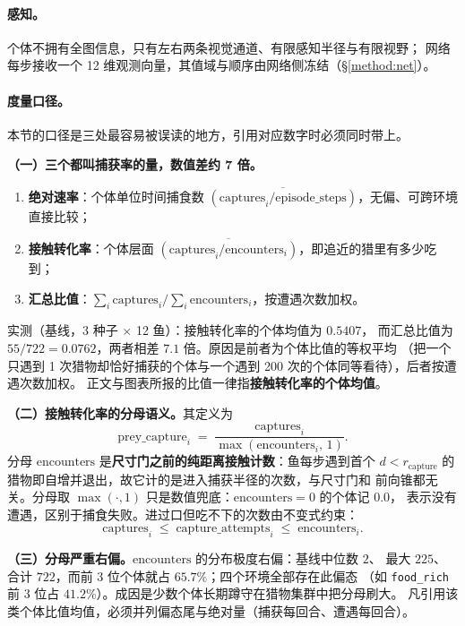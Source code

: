 \paragraph{感知。}个体不拥有全图信息，只有左右两条视觉通道、有限感知半径与有限视野；
网络每步接收一个 12 维观测向量，其值域与顺序由网络侧冻结（\S\ref{method:net}）。

\paragraph{度量口径。}本节的口径是三处最容易被误读的地方，引用对应数字时必须同时带上。

\textbf{（一）三个都叫捕获率的量，数值差约 7 倍。}
\begin{enumerate}
  \item \textbf{绝对速率}：个体单位时间捕食数 $\overline{(\text{captures}_i/\text{episode\_steps})}$，无偏、可跨环境直接比较；
  \item \textbf{接触转化率}：个体层面 $\overline{(\text{captures}_i/\text{encounters}_i)}$，即追近的猎里有多少吃到；
  \item \textbf{汇总比值}：$\sum_i\text{captures}_i/\sum_i\text{encounters}_i$，按遭遇次数加权。
\end{enumerate}
实测（基线，3 种子 $\times$ 12 鱼）：接触转化率的个体均值为 $0.5407$，
而汇总比值为 $55/722=0.0762$，两者相差 $7.1$ 倍。原因是前者为个体比值的等权平均
（把一个只遇到 1 次猎物却恰好捕获的个体与一个遇到 200 次的个体同等看待），后者按遭遇次数加权。
正文与图表所报的比值一律指\textbf{接触转化率的个体均值}。

\textbf{（二）接触转化率的分母语义。}其定义为
\begin{equation}\label{eq:prey-capture}
  \text{prey\_capture}_i \;=\; \frac{\text{captures}_i}{\max(\text{encounters}_i,\,1)} .
\end{equation}
分母 $\text{encounters}$ 是\textbf{尺寸门之前的纯距离接触计数}：鱼每步遇到首个
$d<r_{\text{capture}}$ 的猎物即自增并退出，故它计的是进入捕获半径的次数，与尺寸门和
前向锥都无关。分母取 $\max(\cdot,1)$ 只是数值兜底：$\text{encounters}=0$ 的个体记 $0.0$，
表示没有遭遇，区别于捕食失败。进过口但吃不下的次数由不变式约束：
\begin{equation}\label{eq:capture-ineq}
  \text{captures}_i \;\le\; \text{capture\_attempts}_i \;\le\; \text{encounters}_i .
\end{equation}

\textbf{（三）分母严重右偏。}$\text{encounters}$ 的分布极度右偏：基线中位数 $2$、
最大 $225$、合计 $722$，而前 3 位个体就占 $65.7\%$；四个环境全部存在此偏态
（如 \texttt{food\_rich} 前 3 位占 $41.2\%$）。成因是少数个体长期蹲守在猎物集群中把分母刷大。
凡引用该类个体比值均值，必须并列偏态尾与绝对量（捕获每回合、遭遇每回合）。

